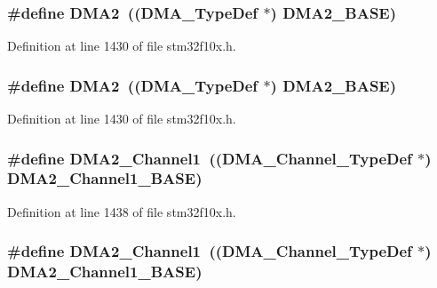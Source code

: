 \subsubsection[{\texorpdfstring{D\+M\+A2}{DMA2}}]{\setlength{\rightskip}{0pt plus 5cm}\#define D\+M\+A2~(({\bf D\+M\+A\+\_\+\+Type\+Def} $\ast$) {\bf D\+M\+A2\+\_\+\+B\+A\+SE})}\hypertarget{group___peripheral__declaration_ga506520140eec1708bc7570c49bdf972d}{}\label{group___peripheral__declaration_ga506520140eec1708bc7570c49bdf972d}


Definition at line 1430 of file stm32f10x.\+h.

\subsubsection[{\texorpdfstring{D\+M\+A2}{DMA2}}]{\setlength{\rightskip}{0pt plus 5cm}\#define D\+M\+A2~(({\bf D\+M\+A\+\_\+\+Type\+Def} $\ast$) {\bf D\+M\+A2\+\_\+\+B\+A\+SE})}\hypertarget{group___peripheral__declaration_ga506520140eec1708bc7570c49bdf972d}{}\label{group___peripheral__declaration_ga506520140eec1708bc7570c49bdf972d}


Definition at line 1430 of file stm32f10x.\+h.

\subsubsection[{\texorpdfstring{D\+M\+A2\+\_\+\+Channel1}{DMA2_Channel1}}]{\setlength{\rightskip}{0pt plus 5cm}\#define D\+M\+A2\+\_\+\+Channel1~(({\bf D\+M\+A\+\_\+\+Channel\+\_\+\+Type\+Def} $\ast$) {\bf D\+M\+A2\+\_\+\+Channel1\+\_\+\+B\+A\+SE})}\hypertarget{group___peripheral__declaration_gad86c75e1ff89e03e15570f47962865c8}{}\label{group___peripheral__declaration_gad86c75e1ff89e03e15570f47962865c8}


Definition at line 1438 of file stm32f10x.\+h.

\subsubsection[{\texorpdfstring{D\+M\+A2\+\_\+\+Channel1}{DMA2_Channel1}}]{\setlength{\rightskip}{0pt plus 5cm}\#define D\+M\+A2\+\_\+\+Channel1~(({\bf D\+M\+A\+\_\+\+Channel\+\_\+\+Type\+Def} $\ast$) {\bf D\+M\+A2\+\_\+\+Channel1\+\_\+\+B\+A\+SE})}\hypertarget{group___peripheral__declaration_gad86c75e1ff89e03e15570f47962865c8}{}\label{group___peripheral__declaration_gad86c75e1ff89e03e15570f47962865c8}


